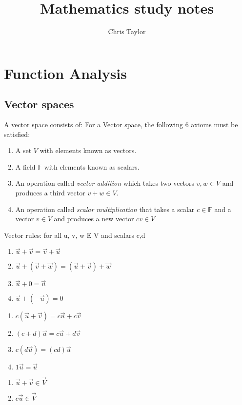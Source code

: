 \documentclass{article}
\title{Mathematics study notes}
\author{Chris Taylor}
\date{} %
\begin{document}
\maketitle

\tableofcontents

\section{Function Analysis}

\subsection{Vector spaces}

A vector space consists of:
For a Vector space, the following 6 axioms must be satisfied:
\begin{enumerate}
    \item A set $V$ with elements known as vectors.
    \item A field $\mathbb{F}$ with elements known as scalars.
    \item An operation called \textit{vector addition} which takes two vectors $v, w \in V$ and produces a third vector $v + w \in V$.
    \item An operation called \textit{scalar multiplication} that takes a scalar $c \in \mathbb{F}$ and a vector $v \in V$ and produces a new vector $cv \in V$
\end{enumerate}

Vector rules: for all u, v, w E V and scalars c,d
\begin{enumerate}
    \item $\vec{u} + \vec{v} = \vec{v} + \vec{u}$
    \item $\vec{u} + (\vec{v} + \vec{w}) = (\vec{u} + \vec{v}) + \vec{w}$
    \item $\vec{u} + 0 = \vec{u}$
    \item $\vec{u} + (-\vec{u}) = 0$
\end{enumerate}

\begin{enumerate}
    \item $c(\vec{u} + \vec{v}) = c\vec{u} + c\vec{v}$
    \item $(c + d)\vec{u} = c\vec{u} + d\vec{v}$
    \item $c(d\vec{u}) = (cd)\vec{u}$
    \item $1\vec{u} = \vec{u}$
\end{enumerate}

\begin{enumerate}
    \item $\vec{u} + \vec{v} \in \vec{V}$
    \item $c\vec{u} \in \vec{V}$
\end{enumerate}
\end{document}
